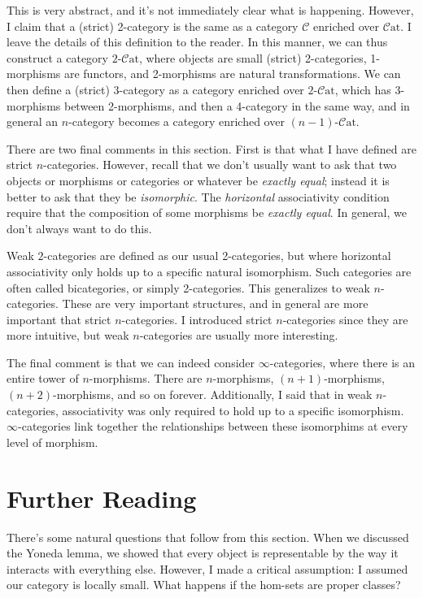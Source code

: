 \documentclass[11pt, letterpaper]{article}
\newcommand{\Cat}{\mathcal{C}\mathrm{at}}
\begin{document}
This is very abstract, and it's not immediately clear what is happening. However, I claim that a (strict) 2-category is the same as a category $\mathcal{C} $ enriched over $\Cat$. I leave the details of this definition to the reader. In this manner, we can thus construct a category $2$-$\Cat$, where objects are small (strict) 2-categories, 1-morphisms are functors, and 2-morphisms are natural transformations. We can then define a (strict) 3-category as a category enriched over $2$-$\Cat$, which has 3-morphisms between 2-morphisms, and then a 4-category in the same way, and in general an $n$-category becomes a category enriched over $(n-1)$-$\Cat$.

There are two final comments in this section. First is that what I have defined are strict $n$-categories. However, recall that we don't usually want to ask that two objects or morphisms or categories or whatever be \emph{exactly equal}; instead it is better to ask that they be \emph{isomorphic}. The \emph{horizontal} associativity condition require that the composition of some morphisms be \emph{exactly equal}. In general, we don't always want to do this.

Weak $2$-categories are defined as our usual 2-categories, but where horizontal associativity only holds up to a specific natural isomorphism. Such categories are often called bicategories, or simply 2-categories. This generalizes to weak $n$-categories. These are very important structures, and in general are more important that strict $n$-categories. I introduced strict $n$-categories since they are more intuitive, but weak $n$-categories are usually more interesting.

The final comment is that we can indeed consider $\infty $-categories, where there is an entire tower of $n$-morphisms. There are $n$-morphisms, $(n+1)$-morphisms, $(n+2)$-morphisms, and so on forever. Additionally, I said that in weak $n$-categories, associativity was only required to hold up to a specific isomorphism. $\infty $-categories link together the relationships between these isomorphims at every level of morphism.


\section{Further Reading}

There's some natural questions that follow from this section. When we discussed the Yoneda lemma, we showed that every object is representable by the way it interacts with everything else. However, I made a critical assumption: I assumed our category is locally small. What happens if the hom-sets are proper classes?
\end{document}
